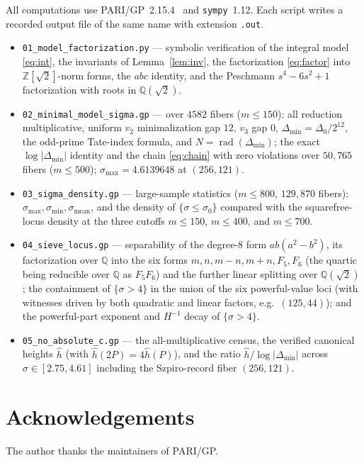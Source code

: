 \documentclass[11pt,reqno]{amsart}
\theoremstyle{plain}
\theoremstyle{definition}
\newcommand{\Q}{\mathbb{Q}}
\newcommand{\Z}{\mathbb{Z}}
\newcommand{\hath}{\hat{h}}
\newcommand{\rad}{\operatorname{rad}}
\begin{document}
All computations use PARI/GP~2.15.4~\cite{pari} and \texttt{sympy}~1.12. Each
script writes a recorded output file of the same name with extension
\texttt{.out}.
\begin{itemize}
\item \texttt{01\_model\_factorization.py} --- symbolic verification of the
integral model \eqref{eq:int}, the invariants of Lemma~\ref{lem:inv}, the
factorization \eqref{eq:factor} into $\Z[\sqrt2]$-norm forms, the $abc$ identity,
and the Peschmann $s^4-6s^2+1$ factorization with roots in $\Q(\sqrt2)$.
\item \texttt{02\_minimal\_model\_sigma.gp} --- over $4582$ fibers ($m\le150$):
all reduction multiplicative, uniform $v_2$ minimalization gap $12$, $v_3$ gap $0$,
$\Delta_{\min}=\Delta_0/2^{12}$, the odd-prime Tate-index formula, and
$N=\rad(\Delta_{\min})$; the exact $\log|\Delta_{\min}|$ identity and the chain
\eqref{eq:chain} with zero violations over $50{,}765$ fibers ($m\le500$);
$\sigma_{\max}=4.6139648$ at $(256,121)$.
\item \texttt{03\_sigma\_density.gp} --- large-sample statistics ($m\le800$,
$129{,}870$ fibers): $\sigma_{\max},\sigma_{\min},\sigma_{\mathrm{mean}}$, and the
density of $\{\sigma\le\sigma_0\}$ compared with the squarefree-locus density at the
three cutoffs $m\le150$, $m\le400$, and $m\le700$.
\item \texttt{04\_sieve\_locus.gp} --- separability of the degree-$8$ form
$ab(a^2-b^2)$, its factorization over $\Q$ into the six forms $m,n,m-n,m+n,F_5,F_6$
(the quartic being reducible over $\Q$ as $F_5F_6$) and the further linear splitting
over $\Q(\sqrt2)$; the containment of $\{\sigma>4\}$ in the union of the six
powerful-value loci (with witnesses driven by both quadratic and linear factors,
e.g.\ $(125,44)$); and the powerful-part exponent and $H^{-1}$ decay of
$\{\sigma>4\}$.
\item \texttt{05\_no\_absolute\_c.gp} --- the all-multiplicative census, the
verified canonical heights $\hath$ (with $\hath(2P)=4\hath(P)$), and the ratio
$\hath/\log|\Delta_{\min}|$ across $\sigma\in[2.75,4.61]$ including the Szpiro-record
fiber $(256,121)$.
\end{itemize}

\section*{Acknowledgements}
The author thanks the maintainers of PARI/GP.
\end{document}
